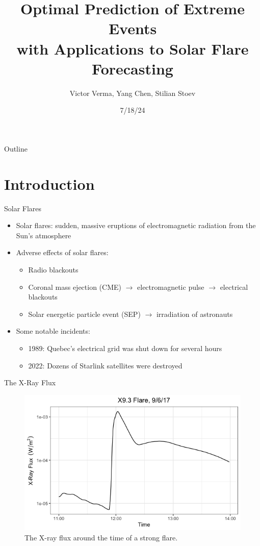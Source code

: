 \documentclass{beamer}
\title[Optimal Prediction of Extreme Events]{Optimal Prediction of Extreme Events \\ with Applications to Solar Flare Forecasting}
\author{Victor Verma, Yang Chen, Stilian Stoev}
\institute[]
{
Department of Statistics \\
University of Michigan
}
\date[7/18/24]{7/18/24}
\begin{document}
\begin{frame}
    \titlepage
\end{frame}

\begin{frame}{Outline}
   \tableofcontents
\end{frame}

\section{Introduction}

\begin{frame}{Solar Flares}
    \begin{itemize}
        \item Solar flares: sudden, massive eruptions of electromagnetic radiation from the Sun's atmosphere
        \item Adverse effects of solar flares: 
        \begin{itemize}
            \item Radio blackouts
            \item Coronal mass ejection (CME) $\rightarrow$ electromagnetic pulse $\rightarrow$ electrical blackouts
            \item Solar energetic particle event (SEP) $\rightarrow$ irradiation of astronauts
        \end{itemize}
        \item Some notable incidents:
        \begin{itemize}
            \item 1989: Quebec's electrical grid was shut down for several hours
            \item 2022: Dozens of Starlink satellites were destroyed
        \end{itemize}
    \end{itemize}
\end{frame}

\begin{frame}{The X-Ray Flux}
    \begin{figure}
        \centering
        \includegraphics[scale=0.5]{flare_flux_example.png}
        \caption{The X-ray flux around the time of a strong flare.}
        \label{fig:flare_flux_example}
    \end{figure}
\end{frame}
\end{document}
